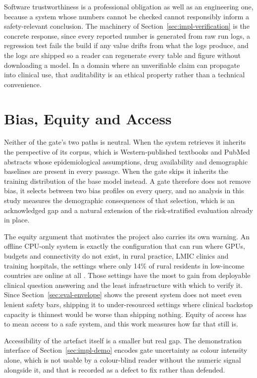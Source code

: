 Software trustworthiness is a professional obligation as well as an
engineering one, because a system whose numbers cannot be checked cannot
responsibly inform a safety-relevant conclusion. The machinery of
Section~\ref{sec:impl-verification} is the concrete response, since every
reported number is generated from raw run logs, a regression test fails the
build if any value drifts from what the logs produce, and the logs are shipped
so a reader can regenerate every table and figure without downloading a model.
In a domain where an unverifiable claim can propagate into clinical use, that
auditability is an ethical property rather than a technical convenience.

\section{Bias, Equity and Access}
\label{sec:lsep-bias}

Neither of the gate's two paths is neutral. When the system retrieves it
inherits the perspective of its corpus, which is Western-published textbooks
and PubMed abstracts whose epidemiological assumptions, drug availability and
demographic baselines are present in every passage. When the gate skips it
inherits the training distribution of the base model instead. A gate therefore
does not remove bias, it selects between two bias profiles on every query, and
no analysis in this study measures the demographic consequences of that
selection, which is an acknowledged gap and a natural extension of the
risk-stratified evaluation already in place.

The equity argument that motivates the project also carries its own warning.
An offline CPU-only system is exactly the configuration that can run where
GPUs, budgets and connectivity do not exist, in rural practice, LMIC clinics
and training hospitals, the settings where only 14\% of rural residents in
low-income countries are online at all \citep{itu2025factsfigures}. Those
settings have the most to gain from deployable clinical question answering and
the least infrastructure with which to verify it. Since
Section~\ref{sec:eval-envelope} shows the present system does not meet even
lenient safety bars, shipping it to under-resourced settings where clinical
backstop capacity is thinnest would be worse than shipping nothing. Equity of
access has to mean access to a safe system, and this work measures how far
that still is.

Accessibility of the artefact itself is a smaller but real gap. The
demonstration interface of Section~\ref{sec:impl-demo} encodes gate
uncertainty as colour intensity alone, which is not usable by a colour-blind
reader without the numeric signal alongside it, and that is recorded as a
defect to fix rather than defended.

